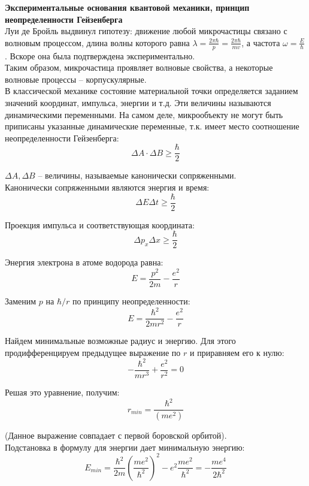 \documentclass{article}
\begin{document}
	\textbf{Экспериментальные основания квантовой механики, принцип неопределенности Гейзенберга}\\

	Луи де Бройль выдвинул гипотезу: движение любой микрочастицы связано с волновым процессом, длина волны которого равна $\lambda=\frac{2\pi\hbar}{p}=\frac{2\pi\hbar}{mv}$, а частота $\omega=\frac{E}{\hbar}$. Вскоре она была подтверждена экспериментально.\\

	Таким образом, микрочастица проявляет волновые свойства, а некоторые волновые процессы -- корпускулярные.\\

	В классической механике состояние материальной точки определяется заданием значений координат, импульса, энергии и т.д. Эти величины называются динамическими переменными. На самом деле, микрообъекту не могут быть приписаны указанные динамические переменные, т.к. имеет место соотношение неопределенности Гейзенберга:
	\begin{equation}
		\Delta A \cdot \Delta B \geq \frac{\hbar}{2}
	\end{equation}

	$\Delta A, \Delta B$ -- величины, называемые канонически сопряженными.\\

	Канонически сопряженными являются энергия и время:
	\begin{equation}
		\Delta E\Delta t \geq \frac{\hbar}{2}
	\end{equation}

	Проекция импульса и соответствующая координата:
	\begin{equation}
		\Delta p_x \Delta x \geq \frac{\hbar}{2}
	\end{equation}

	Энергия электрона в атоме водорода равна:
	\begin{equation}
		E=\frac{p^2}{2m}-\frac{e^2}{r}
	\end{equation}

	Заменим $p$ на $\hbar/r$ по принципу неопределенности:
	\begin{equation}
		E = \frac{\hbar^2}{2mr^2} - \frac{e^2}{r}
	\end{equation}

	Найдем минимальные возможные радиус и энергию. Для этого продифференцируем предыдущее выражение по $r$ и приравняем его к нулю:
	\begin{equation}
		-\frac{\hbar^2}{mr^3}+\frac{e^2}{r^2}=0
	\end{equation}

	Решая это уравнение, получим:
	\begin{equation}
		r_{min} = \frac{\hbar^2}{(me^2)}
	\end{equation}

	(Данное выражение совпадает с первой боровской орбитой).\\

	Подстановка в формулу для энергии дает минимальную энергию:
	\begin{equation}
		E_{min} = \frac{\hbar^2}{2m}(\frac{me^2}{\hbar^2})^2 - e^2\frac{me^2}{\hbar^2} = -\frac{me^4}{2\hbar^2}
	\end{equation}

	
	
\end{document}
